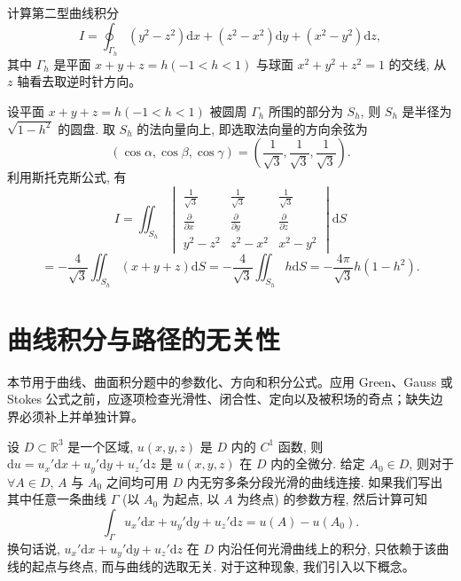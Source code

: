 \documentclass[12pt,fontset=fandol]{ctexart}
\begin{document}
\begin{example}\label{course-example-16-5-5}\quad 计算第二型曲线积分
\[
  I=\oint_{\Gamma_h}(y^2-z^2)\mathrm dx+(z^2-x^2)\mathrm dy+(x^2-y^2)\mathrm dz,
\]
其中 $\Gamma_h$ 是平面 $x+y+z=h(-1<h<1)$ 与球面 $x^2+y^2+z^2=1$ 的交线, 从 $z$ 轴看去取逆时针方向。

\end{example}
\begin{solve}\quad 设平面 $x+y+z=h(-1<h<1)$ 被圆周 $\Gamma_h$ 所围的部分为 $S_h$, 则 $S_h$ 是半径为 $\sqrt{1-h^2}$ 的圆盘. 取 $S_h$ 的法向量向上, 即选取法向量的方向余弦为
\[
  (\cos\alpha,\cos\beta,\cos\gamma)=\left(\frac1{\sqrt3},\frac1{\sqrt3},\frac1{\sqrt3}\right).
\]
利用斯托克斯公式, 有
\[
  I=\iint_{S_h}
  \begin{vmatrix}
    \frac1{\sqrt3}&\frac1{\sqrt3}&\frac1{\sqrt3}\\
    \frac{\partial}{\partial x}&\frac{\partial}{\partial y}&\frac{\partial}{\partial z}\\
    y^2-z^2&z^2-x^2&x^2-y^2
  \end{vmatrix}\mathrm dS
\]
\[
  =-\frac4{\sqrt3}\iint_{S_h}(x+y+z)\mathrm dS
  =-\frac4{\sqrt3}\iint_{S_h}h\mathrm dS
  =-\frac{4\pi}{\sqrt3}h(1-h^2).
\]

\end{solve}


\section{曲线积分与路径的无关性}\label{course-16-7}
本节用于曲线、曲面积分题中的参数化、方向和积分公式。应用 Green、Gauss 或 Stokes 公式之前，应逐项检查光滑性、闭合性、定向以及被积场的奇点；缺失边界必须补上并单独计算。

设 $D\subset\mathbb R^3$ 是一个区域, $u(x,y,z)$ 是 $D$ 内的 $C^1$ 函数, 则 $\mathrm du=u_x'\mathrm dx+u_y'\mathrm dy+u_z'\mathrm dz$ 是 $u(x,y,z)$ 在 $D$ 内的全微分. 给定 $A_0\in D$, 则对于 $\forall A\in D$, $A$ 与 $A_0$ 之间均可用 $D$ 内无穷多条分段光滑的曲线连接. 如果我们写出其中任意一条曲线 $\Gamma$ (以 $A_0$ 为起点, 以 $A$ 为终点) 的参数方程, 然后计算可知
\[
  \int_\Gamma u_x'\mathrm dx+u_y'\mathrm dy+u_z'\mathrm dz=u(A)-u(A_0).
\]
换句话说, $u_x'\mathrm dx+u_y'\mathrm dy+u_z'\mathrm dz$ 在 $D$ 内沿任何光滑曲线上的积分, 只依赖于该曲线的起点与终点, 而与曲线的选取无关. 对于这种现象, 我们引入以下概念。
\end{document}
